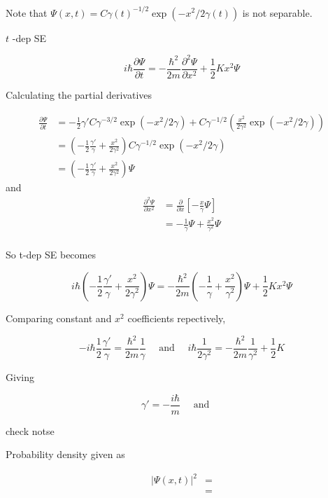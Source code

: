 \documentclass[a4paper]{article}
\begin{document}
Note that $ \Psi(x,t) = C \gamma(t)^{-1/2} \exp(-x^{2}/2\gamma(t)) $ is not separable.


$ t $ -dep SE 

\[ i \hbar \frac{\partial \Psi }{\partial t} = - \frac{\hbar^{2}}{2m} \frac{\partial^{2} \Psi }{\partial x^{2}} + \frac{1}{2}Kx^{2} \Psi \]

Calculating the partial derivatives

\begin{align*}
\frac{\partial \Psi }{\partial t}& = -\frac{1}{2} \gamma' C \gamma^{-3/2} \exp(-x^{2}/2\gamma)  + C \gamma^{-1/2}  \left(\frac{x^{2}}{2 \gamma^{2}}\exp(-x^{2}/2\gamma) \right)    \\
& = \left( - \frac{1}{2} \frac{\gamma'}{\gamma} + \frac{x^{2}}{2 \gamma^{2}} \right) C \gamma^{-1/2} \exp(-x^{2}/2\gamma) \\
& = \left( - \frac{1}{2} \frac{\gamma'}{\gamma} + \frac{x^{2}}{2 \gamma^{2}} \right) \Psi
\end{align*}  
and 
\begin{align*}
\frac{\partial^{2} \Psi }{\partial x^{2}} & = \frac{\partial }{\partial x} \left[ -  \frac{x}{\gamma} \Psi \right] \\
& =  -  \frac{1}{\gamma} \Psi + \frac{x^{2}}{\gamma^{2}} \Psi   \\
\end{align*}      

So t-dep SE becomes

\[ i \hbar \left( - \frac{1}{2} \frac{\gamma'}{\gamma} + \frac{x^{2}}{2 \gamma^{2}} \right) \Psi = - \frac{\hbar^{2}}{2m} \left(   -\frac{1}{\gamma} + \frac{x^{2}}{\gamma^{2}} \right) \Psi + \frac{1}{2} K x^{2} \Psi \]    

Comparing constant and $ x^{2} $ coefficients repectively,        

\[ - i \hbar \frac{1}{2} \frac{\gamma'}{\gamma} = \frac{\hbar^{2}}{2m} \frac{1}{\gamma} \quad \text{ and } \quad i\hbar \frac{1}{2\gamma^{2}} = - \frac{\hbar^{2}}{2m} \frac{1}{\gamma^{2}} +  \frac{1}{2} K  \]

Giving 



\[ \gamma' = - \frac{i \hbar}{m} \quad \text{ and } \quad  \]

check notse


Probability density given as 

\begin{align*}
|   \Psi(x,t)  |^{2} & = \\
& = 
\end{align*}
\end{document}
